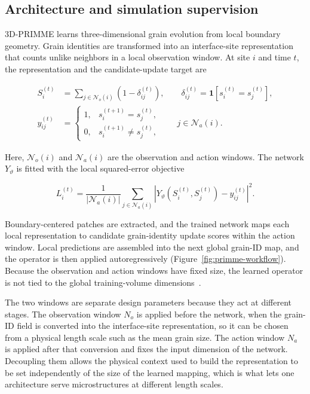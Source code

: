 \documentclass[proposalMode]{ufdissertation}
\begin{document}
\subsection{Architecture and simulation supervision}

3D-PRIMME learns three-dimensional grain evolution from local boundary geometry. Grain identities are transformed into an interface-site representation that counts unlike neighbors in a local observation window. At site \(i\) and time \(t\), the representation and the candidate-update target are

\begin{equation}
\begin{aligned}
S_i^{(t)}
&=
\sum_{j\in\mathcal{N}_o(i)}
\left(1-\delta_{ij}^{(t)}\right),
\qquad
\delta_{ij}^{(t)}
=
\mathbf{1}\!\left[s_i^{(t)}=s_j^{(t)}\right],\\
y_{ij}^{(t)}
&=
\begin{cases}
1, & s_i^{(t+1)}=s_j^{(t)},\\
0, & s_i^{(t+1)}\ne s_j^{(t)},
\end{cases}
\qquad j\in\mathcal{N}_a(i).
\end{aligned}
\label{eq:primme-representation}
\end{equation}

Here, \(\mathcal{N}_o(i)\) and \(\mathcal{N}_a(i)\) are the observation and action windows. The network \(Y_\vartheta\) is fitted with the local squared-error objective

\begin{equation}
L_i^{(t)}
=
\frac{1}{\left|\mathcal{N}_a(i)\right|}
\sum_{j\in\mathcal{N}_a(i)}
\left|
Y_\vartheta\!\left(S_i^{(t)},S_j^{(t)}\right)
-y_{ij}^{(t)}
\right|^2 .
\label{eq:primme-loss}
\end{equation}

Boundary-centered patches are extracted, and the trained network maps each local representation to candidate grain-identity update scores within the action window. Local predictions are assembled into the next global grain-ID map, and the operator is then applied autoregressively (Figure~\ref{fig:primme-workflow}). Because the observation and action windows have fixed size, the learned operator is not tied to the global training-volume dimensions~\cite{tian2026threeDprimme}.

The two windows are separate design parameters because they act at different stages. The observation window \(N_o\) is applied before the network, when the grain-ID field is converted into the interface-site representation, so it can be chosen from a physical length scale such as the mean grain size. The action window \(N_a\) is applied after that conversion and fixes the input dimension of the network. Decoupling them allows the physical context used to build the representation to be set independently of the size of the learned mapping, which is what lets one architecture serve microstructures at different length scales.
\end{document}
